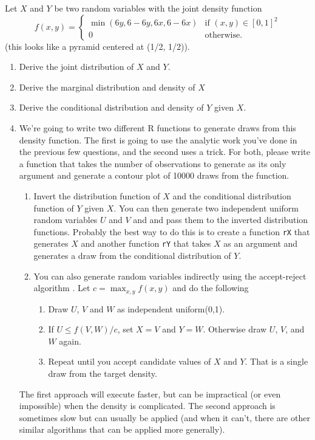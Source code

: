 \begin{hw}
  Let $X$ and $Y$ be two random variables with the joint density
  function
  \begin{equation*}
    f(x, y) = \begin{cases}
      \min(6 y, 6 - 6y, 6 x, 6 - 6 x) & \text{if } (x, y) \in [0,1]^2 \\
      0 & \text{otherwise.}
    \end{cases}
  \end{equation*}
  (this looks like a pyramid centered at (1/2, 1/2)).
  \begin{enumerate}
  \item Derive the joint distribution of $X$ and $Y$.
  \item Derive the marginal distribution and density of $X$
  \item Derive the conditional distribution and density of $Y$ given
    $X$.
  \item We're going to write two different R functions to generate
    draws from this density function. The first is going to use the
    analytic work you've done in the previous few questions, and the
    second uses a trick. For both, please write a function that takes
    the number of observations to generate as its only argument and
    generate a contour plot of 10000 draws from the function.
    \begin{enumerate}
    \item Invert the distribution function of $X$ and the conditional
      distribution function of $Y$ given $X$. You can then generate
      two independent uniform random variables $U$ and $V$ and and
      pass them to the inverted distribution functions. Probably the
      best way to do this is to create a function \texttt{rX} that
      generates $X$ and another function \texttt{rY} that takes $X$ as
      an argument and generates a draw from the conditional
      distribution of $Y$.
    \item You can also generate random variables indirectly using the
      accept-reject algorithm \citep[Section 5.6.2]{CB02}. Let $c =
      \max_{x,y} f(x,y)$ and do the following
      \begin{enumerate}
      \item Draw $U$, $V$ and $W$ as independent uniform(0,1).
      \item If $U \leq f(V,W) / c$, set $X=V$ and $Y=W$. Otherwise draw
        $U$, $V$, and $W$ again.
      \item Repeat until you accept candidate values of $X$ and
        $Y$. That is a single draw from the target density.
      \end{enumerate}
    \end{enumerate}

    The first approach will execute faster, but can be impractical (or
    even impossible) when the density is complicated. The second
    approach is sometimes slow but can usually be applied (and when it
    can't, there are other similar algorithms that can be applied more
    generally).
  \end{enumerate}
\end{hw}

